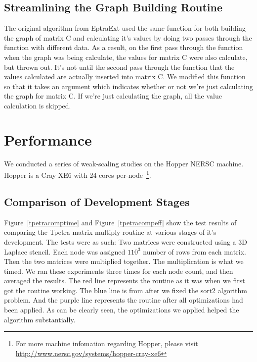 \documentclass{article}
\begin{document}
\subsection{Streamlining the Graph Building Routine}
The original algorithm from EptraExt used the same function for both building the graph of matrix C and calculating it's 
values by doing two passes through the function with different data. 
As a result, on the first pass through the function when the graph was being calculate, the values for matrix C were also 
calculate, but thrown out. It's not until the second pass through the function 
that the values calculated are actually inserted into matrix C. We modified this function so that it
takes an argument which indicates whether or not we're just calculating the graph for matrix C. If we're just calculating 
the graph, all the value calculation is skipped.

\section{Performance}
We conducted a series of weak-scaling studies on the Hopper NERSC machine. Hopper is a Cray XE6 with 24 cores
per-node~\footnote{For more machine infomation regarding Hopper, please visit \url{http://www.nersc.gov/systems/hopper-cray-xe6}}.

\subsection{Comparison of Development Stages}
Figure~\ref{tpetracomptime} and Figure~\ref{tpetracompeff} show the test results of comparing the Tpetra matrix multiply 
routine at various stages of it's 
development.  The tests were as such: Two matrices were constructed using a 3D Laplace stencil. Each node was assigned 
$110^3$ number of rows from each matrix. Then the two matrices were multiplied together. The multiplication is what 
we timed. We ran these experiments three times for each node count, and then averaged the results.
The red line represents the routine as it was when we first got the routine working. The blue line is from after 
we fixed the sort2 algorithm problem. And the purple line represents the routine after all optimizations had been applied.
As can be clearly seen, the optimizations we applied helped the algorithm substantially.
\end{document}
